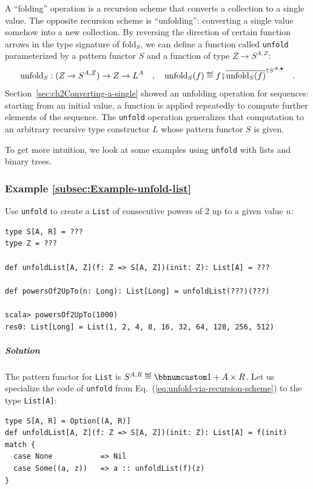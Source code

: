 A \textsf{``}folding\textsf{''} operation is a recursion scheme that converts a collection
to a single value. The opposite recursion scheme is \textsf{``}unfolding\textsf{''}:
converting a single value somehow into a new collection. By reversing
the direction of certain function arrows in the type signature of
$\text{fold}_{S}$, we can define a function called \lstinline!unfold!
parameterized by a pattern functor $S$ and a function of type $Z\rightarrow S^{A,Z}$:
\begin{equation}
\text{unfold}_{S}:(Z\rightarrow S^{A,Z})\rightarrow Z\rightarrow L^{A}\quad,\quad\text{unfold}_{S}(f)\triangleq f\bef\overline{\text{unfold}_{S}(f)}^{\uparrow S^{A,\bullet}}\quad.\label{eq:unfold-via-recursion-scheme}
\end{equation}
Section~\ref{sec:ch2Converting-a-single} showed an unfolding operation
for sequences: starting from an initial value, a function is applied
repeatedly to compute further elements of the sequence. The \lstinline!unfold!
operation generalizes that computation to an arbitrary recursive type
constructor $L$ whose pattern functor $S$ is given. 

To get more intuition, we look at some examples using \lstinline!unfold!
with lists and binary trees.

\subsubsection{Example \label{subsec:Example-unfold-list}\ref{subsec:Example-unfold-list}}

Use \lstinline!unfold! to create a \lstinline!List! of consecutive
powers of $2$ up to a given value $n$: 
\begin{lstlisting}
type S[A, R] = ???
type Z = ???

def unfoldList[A, Z](f: Z => S[A, Z])(init: Z): List[A] = ???

def powersOf2UpTo(n: Long): List[Long] = unfoldList(???)(???)

scala> powersOf2UpTo(1000)
res0: List[Long] = List(1, 2, 4, 8, 16, 32, 64, 128, 256, 512)
\end{lstlisting}


\subparagraph{Solution}

The pattern functor for \lstinline!List! is $S^{A,R}\triangleq\bbnum 1+A\times R$.
Let us specialize the code of \lstinline!unfold! from Eq.~(\ref{eq:unfold-via-recursion-scheme})
to the type \lstinline!List[A]!:
\begin{lstlisting}
type S[A, R] = Option[(A, R)]
def unfoldList[A, Z](f: Z => S[A, Z])(init: Z): List[A] = f(init) match {
  case None           => Nil
  case Some((a, z))   => a :: unfoldList(f)(z)
}
\end{lstlisting}

